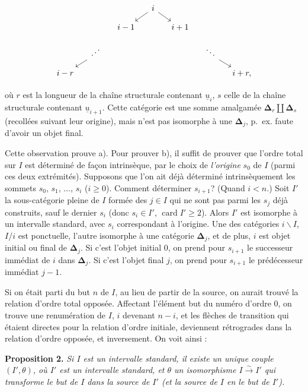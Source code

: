 \documentclass[11pt]{article}
\newcommand{\printedpage}[1]{\if\relax\detokenize{#1}\relax\else\marginpar{\raggedright\footnotesize p.~#1}\fi}
\newcommand{\msp}[1]{\marginpar{\raggedright\footnotesize [#1]}}
\newcommand{\bD}{\boldsymbol{\Delta}}
\newcommand{\iddots}{\mathinner{\mkern1mu\raise1pt\hbox{.}\mkern2mu\raise4pt\hbox{.}\mkern2mu\raise7pt\hbox{.}\mkern1mu}}
\begin{document}
\printedpage{4}

\[
\begin{tikzcd}[column sep=small, row sep=small]
 & & & i \arrow[dl] \arrow[dr] & & & \\
 & & i-1 & & i+1 & & \\
 & \iddots \arrow[dl] & & & & \ddots \arrow[dr] & \\
 i-r & & & & & & i+r, %
\end{tikzcd}
\]

où $r$ est la longueur de la chaîne structurale contenant $\underline{u}_i$, $s$ celle de la chaîne structurale contenant $\underline{u}_{i+1}$. Cette catégorie est une somme amalgamée $\bD_r \amalg \bD_s$ (recollées suivant leur origine), mais n'est pas isomorphe à une $\bD_j$, p.~ex. faute d'avoir un objet final.

Cette observation prouve a). Pour prouver b), il suffit de prouver que l'ordre total sur $I$ est déterminé de façon intrinsèque, par le choix de \textit{l'origine} $s_0$ de $I$ (parmi ces %
deux extrémités). Supposons que l'on ait déjà déterminé intrinsèquement les sommets $s_0$, $s_1$, $\ldots$, $s_i$ ($i \geq 0$). Comment déterminer $s_{i+1}$? (Quand $i < n$.) Soit $I'$ la sous-catégorie pleine de $I$
\msp{page 7}
formée des $j \in I$ qui ne sont pas parmi les $s_j$ déjà construits, sauf le dernier $s_i$ (donc $s_i \in I'$, $\operatorname{card} I' \geq 2$). Alors $I'$ est isomorphe à un intervalle standard, avec $s_i$ correspondant à l'origine. Une des catégories $i\backslash I$, $I/i$ est ponctuelle, l'autre isomorphe à une catégorie $\bD_j$, et de plus, $i$ est objet initial ou final de $\bD_j$. Si c'est l'objet initial $0$, on prend pour $s_{i+1}$ le successeur immédiat de $i$ dans $\bD_j$. Si c'est l'objet final $j$, on prend pour $s_{i+1}$ le prédécesseur immédiat $j-1$.

Si on était parti du but $n$ de $I$, au lieu de partir de la source, on aurait trouvé la relation d'ordre total opposée. Affectant l'élément but du numéro d'ordre $0$, on trouve une renumération de $I$, $i$ devenant $n-i$, et les flèches de transition qui étaient directes pour la relation d'ordre initiale, deviennent rétrogrades dans la relation d'ordre opposée, et inversement. On voit ainsi :

\textbf{Proposition 2.} \textit{Si $I$ est un intervalle standard, il existe un unique couple $(I',\theta)$, où $I'$ est un intervalle standard, et $\theta$ un isomorphisme $I \xrightarrow{\sim} I'$ qui transforme le but de $I$ dans la source de $I'$ (et la source de $I$ en le but de $I'$).}
\end{document}
